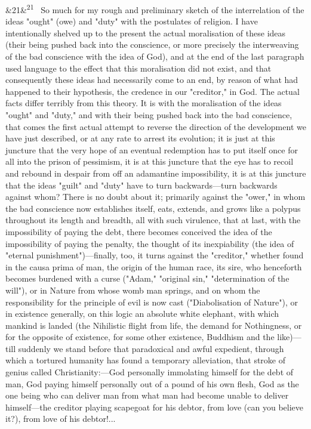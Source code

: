 \documentclass[12pt]{article}
\newcommand{\para}[1][]{\par\noindent\ifx&#1&\else\textsuperscript{\footnotesize #1}~\fi}
\begin{document}
\para[21] So much for my rough and preliminary sketch of the interrelation of the ideas "ought" (owe) and "duty" with the postulates of religion. I have intentionally shelved up to the present the actual moralisation of these ideas (their being pushed back into the conscience, or more precisely the interweaving of the bad conscience with the idea of God), and at the end of the last paragraph used language to the effect that this moralisation did not exist, and that consequently these ideas had necessarily come to an end, by reason of what had happened to their hypothesis, the credence in our "creditor," in God. The actual facts differ terribly from this theory. It is with the moralisation of the ideas "ought" and "duty," and with their being pushed back into the bad conscience, that comes the first actual attempt to reverse the direction of the development we have just described, or at any rate to arrest its evolution; it is just at this juncture that the very hope of an eventual redemption has to put itself once for all into the prison of pessimism, it is at this juncture that the eye has to recoil and rebound in despair from off an adamantine impossibility, it is at this juncture that the ideas "guilt" and "duty" have to turn backwards---turn backwards against whom? There is no doubt about it; primarily against the "ower," in whom the bad conscience now establishes itself, eats, extends, and grows like a polypus throughout its length and breadth, all with such virulence, that at last, with the impossibility of paying the debt, there becomes conceived the idea of the impossibility of paying the penalty, the thought of its inexpiability (the idea of "eternal punishment")---finally, too, it turns against the "creditor," whether found in the causa prima of man, the origin of the human race, its sire, who henceforth becomes burdened with a curse ("Adam," "original sin," "determination of the will"), or in Nature from whose womb man springs, and on whom the responsibility for the principle of evil is now cast ("Diabolisation of Nature"), or in existence generally, on this logic an absolute white elephant, with which mankind is landed (the Nihilistic flight from life, the demand for Nothingness, or for the opposite of existence, for some other existence, Buddhism and the like)---till suddenly we stand before that paradoxical and awful expedient, through which a tortured humanity has found a temporary alleviation, that stroke of genius called Christianity:---God personally immolating himself for the debt of man, God paying himself personally out of a pound of his own flesh, God as the one being who can deliver man from what man had become unable to deliver himself---the creditor playing scapegoat for his debtor, from love (can you believe it?), from love of his debtor!...
\end{document}
